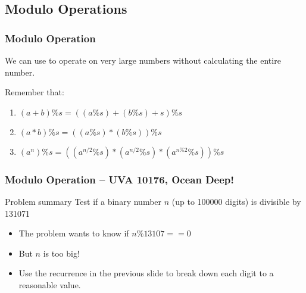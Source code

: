 \documentclass{beamer}
\begin{document}
\subsection{Modulo Operations}
\begin{frame}
  \frametitle{Modulo Operation} 

  {\smaller
  We can use  to operate on very large
  numbers without calculating the entire number.

  \bigskip

  Remember that:
  \begin{enumerate}
  \item $(a+b)\%s = ((a\%s)+(b\%s)+s)\%s$
  \item $(a*b)\%s = ((a\%s)*(b\%s))\%s$
  \item $(a^n)\%s = ((a^{n/2}\%s)*(a^{n/2}\%s)*(a^{n\%2}\%s))\%s$
  \end{enumerate}

  }
\end{frame}

\begin{frame}
  \frametitle{Modulo Operation -- UVA 10176, Ocean Deep!}
  {\smaller
  \begin{block}{Problem summary}
    Test if a binary number $n$ (up to 100000 digits) is divisible by 131071
  \end{block}

  \begin{itemize}
  \item The problem wants to know if $n\%13107 == 0$
  \item But $n$ is too big!

  \item Use the recurrence in the previous slide to break down each
    digit to a reasonable value.
  \end{itemize}}

\end{frame}

\end{document}
